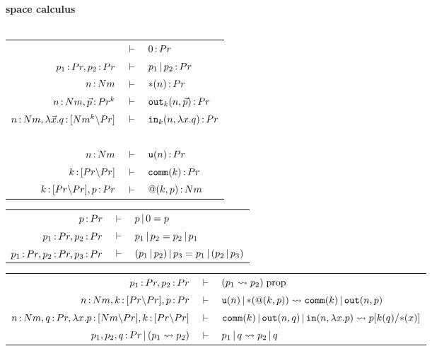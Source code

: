 \documentclass{article}
\begin{document}
\begin{mdframed}
\begin{center}
    \textbf{space calculus}\\~\\
    \renewcommand{\arraystretch}{1.2}

    \begin{tabular}{rcl}
        & $\vdash$ & $0\,{:}\, Pr$\\
        $p_1\,{:}\, Pr, p_2\,{:}\, Pr$ & $\vdash$ & $p_1\,|\, p_2\,{:}\, Pr$\\
        $n\,{:}\, Nm$ & $\vdash$ & $\ast(n)\,{:}\, Pr$\\
        $n\,{:}\, Nm,\vec{p}\,{:}\, Pr^k$ & $\vdash$ & $\mathtt{out}_k(n,\vec{p})\,{:}\, Pr$\\
        $n\,{:}\, Nm, \lambda \vec{x}.q\,{:}\, [Nm^k{\setminus} Pr]$ & $\vdash$ & $\mathtt{in}_k(n,\lambda x.q)\,{:}\, Pr$\\~\\
        $n\,{:}\, Nm$ & $\vdash$ & $\mathtt{u}(n)\,{:}\, Pr$\\
        $k\,{:}\, [Pr{\setminus} Pr]$ & $\vdash$ & $\mathtt{comm}(k)\,{:}\, Pr$\\
        $k\,{:}\, [Pr{\setminus} Pr], p\,{:}\, Pr$ & $\vdash$ & $@(k,p)\,{:}\, Nm$\\
    \end{tabular}

    \vspace{1em}
    
    \begin{tabular}{rcl}
         $p\,{:}\, Pr$ & $\vdash$ & $p\,|\, 0 = p$\\
        $p_1\,{:}\, Pr, p_2\,{:}\, Pr$ & $\vdash$ & $p_1\,|\, p_2 = p_2\,|\, p_1$\\
        $p_1\,{:}\, Pr,p_2\,{:}\, Pr,p_3\,{:}\, Pr$ & $\vdash$ & $(p_1\,|\, p_2)\,|\, p_3 = p_1\,|\, (p_2\,|\, p_3)$\\
    \end{tabular}

    \vspace{1em}
    
    \begin{tabular}{rcl}
         $p_1\,{:}\, Pr,p_2\,{:}\, Pr$ & $\vdash$ & $(p_1\rightsquigarrow p_2)\; \mathrm{prop}$\\
         $n\,{:}\, Nm, k\,{:}\, [Pr{\setminus} Pr], p\,{:}\, Pr$ & $\vdash$ & $\mathtt{u}(n)\,|\, {\ast(@(k,p))}\rightsquigarrow \mathtt{comm}(k)\,|\, \mathtt{out}(n,p)$\\
         $n\,{:}\, Nm, q\,{:}\, Pr, \lambda x.p\,{:}\, [Nm{\setminus} Pr], k\,{:}\, [Pr{\setminus} Pr]$ & $\vdash$ & $\mathtt{comm}(k)\,|\, \mathtt{out}(n,q)\,|\, \mathtt{in}(n,\lambda x.p)\rightsquigarrow  p[k(q){/}{\ast(x)}]$\\
         $p_1,p_2,q\,{:}\, Pr\,|\, (p_1\rightsquigarrow p_2)$ & $\vdash$ & $ p_1\,|\, q\rightsquigarrow  p_2\,|\, q$
    \end{tabular}
\end{center}
\end{mdframed}
\end{document}
